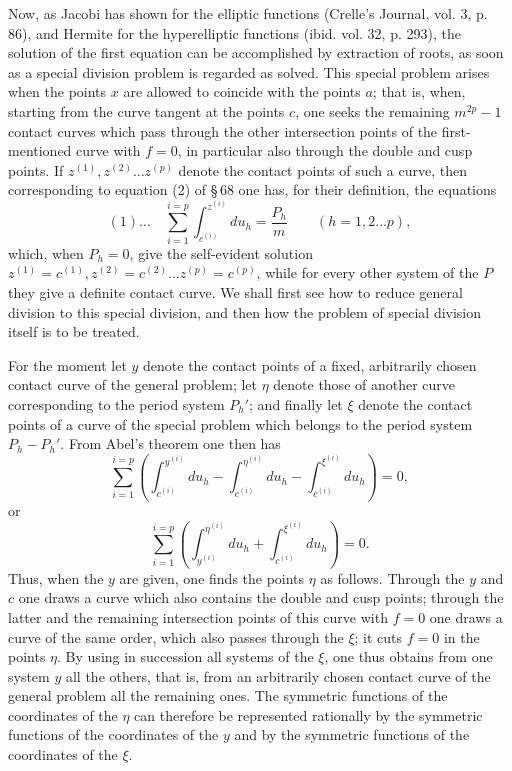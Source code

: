 \documentclass[10pt]{article}
\begin{document}
Now, as Jacobi has shown for the elliptic functions (Crelle's Journal, vol. 3, p. 86), and Hermite for the hyperelliptic functions (ibid. vol. 32, p. 293), the solution of the first equation can be accomplished by extraction of roots, as soon as a special division problem is regarded as solved. This special problem arises when the points \(x\) are allowed to coincide with the points \(a\); that is, when, starting from the curve tangent at the points \(c\), one seeks the remaining \(m^{2p}-1\) contact curves which pass through the other intersection points of the first-mentioned curve with \(f=0\), in particular also through the double and cusp points. If \(z^{(1)},z^{(2)}\ldots z^{(p)}\) denote the contact points of such a curve, then corresponding to equation (2) of \S\,68 one has, for their definition, the equations
\[
(1)\ldots\quad
\sum_{i=1}^{i=p}\int_{c^{(i)}}^{z^{(i)}}du_h=\frac{P_h}{m}
\qquad(h=1,2\ldots p),
\]
which, when \(P_h=0\), give the self-evident solution \(z^{(1)}=c^{(1)},z^{(2)}=c^{(2)}\ldots z^{(p)}=c^{(p)}\), while for every other system of the \(P\) they give a definite contact curve. We shall first see how to reduce general division to this special division, and then how the problem of special division itself is to be treated.

For the moment let \(y\) denote the contact points of a fixed, arbitrarily chosen contact curve of the general problem; let \(\eta\) denote those of another curve corresponding to the period system \(P_h'\); and finally let \(\xi\) denote the contact points of a curve of the special problem which belongs to the period system \(P_h-P_h'\). From Abel's theorem one then has
\[
\sum_{i=1}^{i=p}\left(
\int_{c^{(i)}}^{y^{(i)}}du_h-
\int_{c^{(i)}}^{\eta^{(i)}}du_h-
\int_{c^{(i)}}^{\xi^{(i)}}du_h
\right)=0,
\]
or
\[
\sum_{i=1}^{i=p}\left(
\int_{y^{(i)}}^{\eta^{(i)}}du_h+
\int_{c^{(i)}}^{\xi^{(i)}}du_h
\right)=0.
\]
Thus, when the \(y\) are given, one finds the points \(\eta\) as follows. Through the \(y\) and \(c\) one draws a curve which also contains the double and cusp points; through the latter and the remaining intersection points of this curve with \(f=0\) one draws a curve of the same order, which also passes through the \(\xi\); it cuts \(f=0\) in the points \(\eta\). By using in succession all systems of the \(\xi\), one thus obtains from one system \(y\) all the others, that is, from an arbitrarily chosen contact curve of the general problem all the remaining ones. The symmetric functions of the coordinates of the \(\eta\) can therefore be represented rationally by the symmetric functions of the coordinates of the \(y\) and by the symmetric functions of the coordinates of the \(\xi\).
\end{document}
